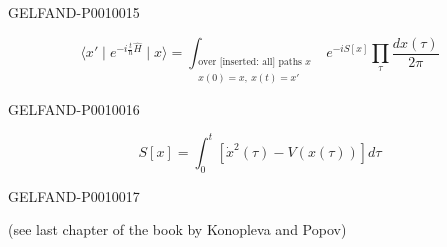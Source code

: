 \begin{GelfandAdjacentEvidence}{GELFAND-P001001}{5}

\begin{equation*}
\langle x'\mid e^{-i\frac{t}{\hbar}\widehat H}\mid x\rangle
=\int_{\substack{\text{over [inserted: all] paths }x\\x(0)=x,\ x(t)=x'}}
e^{-iS[x]}\prod_\tau\frac{dx(\tau)}{2\pi}
\tag{4}
\end{equation*}
\end{GelfandAdjacentEvidence}
\begin{GelfandAdjacentEvidence}{GELFAND-P001001}{6}

\begin{equation*}
S[x]=\int_0^t[\dot x^2(\tau)-V(x(\tau))]d\tau
\tag{5}
\end{equation*}
\end{GelfandAdjacentEvidence}
\begin{GelfandAdjacentEvidence}{GELFAND-P001001}{7}

(see last chapter of the book by Konopleva and Popov)
\end{GelfandAdjacentEvidence}



